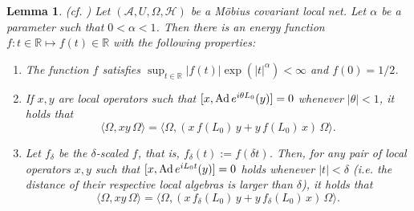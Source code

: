 \documentclass[a4paper,12pt]{article}
\theoremstyle{plain}
\newtheorem{lemm}[theo]{Lemma}
\theoremstyle{definition}
\theoremstyle{remark}
\newcommand{\inner}  [2]{\langle #1 , #2 \rangle}
\newcommand{\binner} [2]{\big\langle #1 , #2 \big\rangle}
\def\RR{{\mathbb R}}
\def\A{{\mathcal A}}
\def\Ad{{\hbox{\rm Ad\,}}}
\begin{document}
\begin{lemm}\label{lem:f} (cf. \cite[Lemma 2.3]{bdf87})
Let $(\A,U,\Omega,\mathcal{H})$ be a M\"obius covariant local net. %
Let $\alpha$ be a parameter such that $0<\alpha<1$.
Then there is an energy function $f : t\in\mathbb{R} \mapsto f(t) \in \mathbb{R}$
with the following properties:
\begin{enumerate}
\item The function $f$ satisfies $\sup_{t\in\RR} |f(t)| \exp(|t|^{\alpha}) < \infty$ and $f(0)=1/2$.

\item If $x,y$ are local operators such that $[x, \Ad e^{i\theta L_0}(y)] = 0$ whenever $|\theta|<1$,
it holds that
\[ \inner{\Omega}{xy\,\Omega} = \binner{\Omega}{\left(x\,f(L_0)\,y + y\,f(L_0)\,x\right)\, \Omega} .\]

\item Let $f_\delta$ be the $\delta$-scaled $f$, that is, $f_\delta(t) := f(\delta t)$. Then, for any pair of local operators $x,y$
such that $[x, \Ad e^{iL_0t}(y)] = 0$ holds whenever $|t|<\delta$ ({\it i.e.} the distance of their respective local algebras
is larger than $\delta$), it holds that
\[ \inner{\Omega}{xy\,\Omega} = \binner{\Omega}{\left(x\,f_\delta(L_0)\,y + y\,f_\delta(L_0)\,x\right)\, \Omega} .\]

\end{enumerate}\end{lemm}
\end{document}
